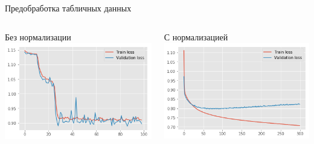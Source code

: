 \documentclass[notes,12pt, aspectratio=169]{beamer}
\begin{document}
\begin{frame}{Предобработка табличных данных}
	\begin{columns}
	\begin{column}{0.5\textwidth}
		\alert{Без нормализации}
		\includegraphics[width=.95\linewidth]{no_prep.png}
	\end{column}
	\hfill
	\begin{column}{0.5\textwidth}
		\alert{С нормализацией}
		\includegraphics[width=.95\linewidth]{with_prep.png}
	\end{column}
\end{columns}
\end{frame}
\end{document}
